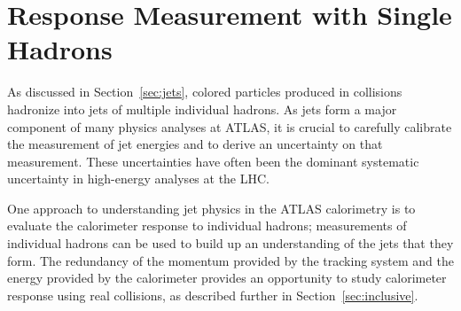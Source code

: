 \chapter{Response Measurement with Single Hadrons}

\newcommand*{\pL}{\ensuremath{\Lambda}\xspace}
\newcommand*{\pLB}{\ensuremath{\bar{\Lambda}}\xspace}
\newcommand*{\pKS}{\ensuremath{K_\text{S}^{0}}\xspace}
\newcommand*{\pKL}{\ensuremath{K_L}\xspace}
\newcommand*{\pP}{\ensuremath{p}\xspace}
\newcommand*{\pAP}{\ensuremath{\bar{p}}\xspace}
\newcommand*{\pip}{\ensuremath{\pi^+}\xspace}
\newcommand*{\pim}{\ensuremath{\pi^-}\xspace}
\newcommand*{\piz}{\ensuremath{\pi^0}\xspace}
\newcommand*{\ep}{\ensuremath{E/p}\xspace}
\newcommand*{\epav}{\ensuremath{\langle E/p \rangle}\xspace}
\newcommand*{\epcor}{\ensuremath{\langle E/p \rangle_{\mathrm{COR}}}\xspace}
\newcommand*{\epbg}{\ensuremath{\langle E/p \rangle_{\mathrm{BG}}}\xspace}
\newcommand*{\Ea}{\ensuremath{E_a}\xspace}
\newcommand*{\QGSP}{\texttt{QGSP\_BERT}\xspace}
\newcommand*{\FTFP}{\texttt{FTFP\_BERT}\xspace}


\label{ch:singlehadrons}

As discussed in Section~\ref{sec:jets}, colored particles produced in collisions hadronize into jets of multiple individual hadrons.
As jets form a major component of many physics analyses at ATLAS, it is crucial to carefully calibrate the measurement of jet energies and to derive an uncertainty on that measurement.
These uncertainties have often been the dominant systematic uncertainty in high-energy analyses at the LHC.

One approach to understanding jet physics in the ATLAS calorimetry is to evaluate the calorimeter response to individual hadrons; measurements of individual hadrons can be used to build up an understanding of the jets that they form.
The redundancy of the momentum provided by the tracking system and the energy provided by the calorimeter provides an opportunity to study calorimeter response using real collisions, as described further in Section~\ref{sec:inclusive}.

